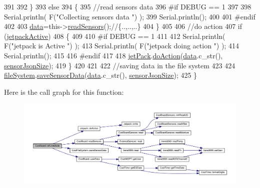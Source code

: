 \begin{DoxyCode}
391                 
392     \}   
393     \textcolor{keywordflow}{else}
394     \{
395         \textcolor{comment}{//read sensors data}
396 \textcolor{preprocessor}{    #if DEBUG == 1}
397 
398         Serial.println( F(\textcolor{stringliteral}{"Collecting sensors data "}) );
399         Serial.println();
400 
401 \textcolor{preprocessor}{    #endif}
402 
403         \hyperlink{classCoolBoard_a427fb753dd8575bdf821c70a5c63d695}{data}=this->\hyperlink{classCoolBoard_ad03abdce2e65f520bbf2cff0f2d083cf}{readSensors}();\textcolor{comment}{//\{..,..,..\}}
404     \}
405 
406     \textcolor{comment}{//do action}
407     \textcolor{keywordflow}{if} (\hyperlink{classCoolBoard_a9be03a913d26e558328935ca3b59a75e}{jetpackActive})
408     \{
409 
410 \textcolor{preprocessor}{    #if DEBUG == 1}
411 
412         Serial.println( F(\textcolor{stringliteral}{"jetpack is Active "}) );
413         Serial.println( F(\textcolor{stringliteral}{"jetpack doing action "}) );
414         Serial.println();
415     
416 \textcolor{preprocessor}{    #endif}
417 
418         \hyperlink{classCoolBoard_a30b1357881b01ccbec676856a91e48e9}{jetPack}.\hyperlink{classJetpack_a86d2e83436ef4b85f4c3a6e85ac785b0}{doAction}(\hyperlink{classCoolBoard_a427fb753dd8575bdf821c70a5c63d695}{data}.c\_str(), \hyperlink{classCoolBoard_a58e4b6072e3ac8b141ec0befb479208e}{sensorJsonSize});
419     \}
420     
421     
422     \textcolor{comment}{//saving data in the file system}
423     
424     \hyperlink{classCoolBoard_a42c2586fbb13ff7f06538e9284e8538d}{fileSystem}.\hyperlink{classCoolFileSystem_a4c560c2ddd40b74b7758e6ceb2c58957}{saveSensorData}(\hyperlink{classCoolBoard_a427fb753dd8575bdf821c70a5c63d695}{data}.c\_str(), 
      \hyperlink{classCoolBoard_a58e4b6072e3ac8b141ec0befb479208e}{sensorJsonSize});
425 \}
\end{DoxyCode}
Here is the call graph for this function\+:
\nopagebreak
\begin{figure}[H]
\begin{center}
\leavevmode
\includegraphics[width=350pt]{classCoolBoard_ae6b5e1274d760462290192acea4adca8_cgraph}
\end{center}
\end{figure}
\mbox{\label{classCoolBoard_aa0bbc4bc605e35618d18e68795c61363}} 
